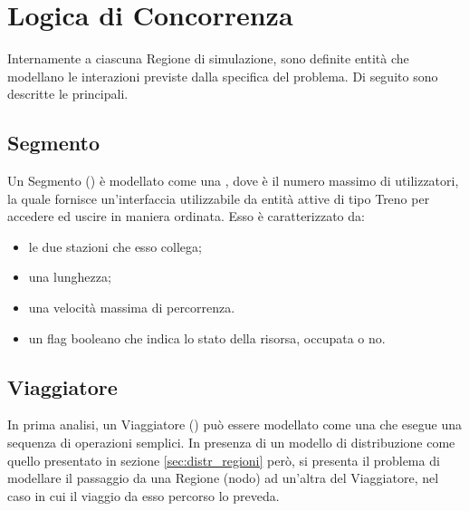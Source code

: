 \section{Logica di Concorrenza}

Internamente a ciascuna Regione di simulazione, sono definite entità che modellano le interazioni previste dalla specifica del problema. Di seguito sono descritte le principali.

	
	\subsection{Segmento}\label{subsec:segment_def}
	
	Un Segmento () è modellato come una , dove  è il numero massimo di utilizzatori, la quale fornisce un'interfaccia utilizzabile da entità attive di tipo Treno per accedere ed uscire in maniera ordinata. Esso è caratterizzato da:
			\begin{itemize}
				\item le due stazioni che esso collega;
				\item una lunghezza;
				\item una velocità massima di percorrenza.
				\item un flag booleano  che indica lo stato della risorsa, occupata o no.
			\end{itemize}


	\subsection{Viaggiatore}\label{subsec:traveler_def}		
	
	In prima analisi, un Viaggiatore () può essere modellato come una  che esegue una sequenza di operazioni semplici. In presenza di un modello di distribuzione come quello presentato in sezione \ref{sec:distr_regioni} però, si presenta il problema di modellare il passaggio da una Regione (nodo) ad un'altra del Viaggiatore, nel caso in cui il viaggio da esso percorso lo preveda.
	
